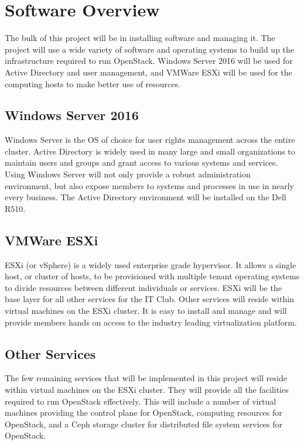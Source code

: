 \documentclass[12pt]{article}
\begin{document}
\section {Software Overview}
The bulk of this project will be in installing software and managing it. The project will use a wide variety of software and 
operating systems to build up the infrastructure required to run OpenStack. Windows Server 2016 will be used for Active Directory
and user management, and VMWare ESXi will be used for the computing hosts to make better use of resources. 

\subsection{Windows Server 2016}
Windows Server is the OS of choice for user rights management across the entire cluster. Active Directory is widely used in many
large and small organizations to maintain users and groups and grant access to various systems and services. Using Windows Server
will not only provide a robust administration environment, but also expose members to systems and processes in use in nearly every
business. The Active Directory environment will be installed on the Dell R510.

\subsection{VMWare ESXi}
ESXi (or vSphere) is a widely used enterprise grade hypervisor. It allows a single host, or cluster of hosts, to be provisioned with
multiple tenant operating systems to divide resources between different individuals or services. ESXi will be the base layer for all
other services for the IT Club. Other services will reside within virtual machines on the ESXi cluster. It is easy to install and manage
and will provide members hands on access to the industry leading virtualization platform.

\subsection{Other Services}
The few remaining services that will be implemented in this project will reside within virtual machines on the ESXi cluster. They will 
provide all the facilities required to run OpenStack effectively. This will include a number of virtual machines providing the control
plane for OpenStack, computing resources for OpenStack, and a Ceph storage cluster for distributed file system services for OpenStack. 
\end{document}
